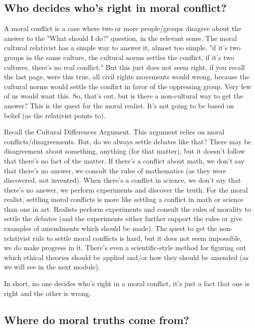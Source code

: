 \subsection{Who decides who's right in moral conflict?}

A moral conflict is a case where two or more people/groups disagree about the answer to the "What should I do?" question, in the relevant sense. The moral cultural relativist has a simple way to answer it, almost too simple, "if it's two groups in the same culture, the cultural norms settles the conflict, if it's two cultures, there's no real conflict." But this just does not seem right, if you recall the last page, were this true, all civil rights movements would wrong, because the cultural norms would settle the conflict in favor of the oppressing group. Very few of us would want this. So, that's out, but is there a non-cultural way to get the answer? This is the quest for the moral realist. It's not going to be based on belief (as the relativist points to).

Recall the Cultural Differences Argument. This argument relies on moral conflicts/disagreements. But, do we always settle debates like that? There may be disagreement about something, anything (for that matter), but it doesn't follow that there's no fact of the matter. If there's a conflict about math, we don't say that there's no answer, we consult the rules of mathematics (as they were discovered, not invented). When there's a conflict in science, we don't say that there's no answer, we perform experiments and discover the truth. For the moral realist, settling moral conflicts is more like settling a conflict in math or science than one in art. Realists perform experiments and consult the rules of morality to settle the debates (and the experiments either further support the rules or give examples of amendments which should be made). The quest to get the non-relativist rule to settle moral conflicts is hard, but it does not seem impossible, we do make progress in it. There's even a scientific-style method for figuring out which ethical theories should be applied and/or how they should be amended (as we will see in the next module).

In short, no one decides who's right in a moral conflict, it's just a fact that one is right and the other is wrong.
\subsection{Where do moral truths come from?}

